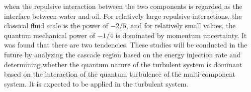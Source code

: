 \documentclass[12pt,a4paper]{jbook}
\begin{document}
    when the repulsive interaction between the two components is regarded as the interface between water and oil.
    For relatively large repulsive interactions,
    the classical fluid scale is the power of $−2/5$,
    and for relatively small values,
    the quantum mechanical power of $-1/4$ is dominated by momentum uncertainty.
    It was found that there are two tendencies.
    These studies will be conducted in the future by analyzing the cascade region
    based on the energy injection rate
    and determining whether the quantum nature of the turbulent system
    is dominant based on the interaction of the quantum turbulence of the multi-component system.
    It is expected to be applied in the turbulent system.
    	\\
\end{document}
